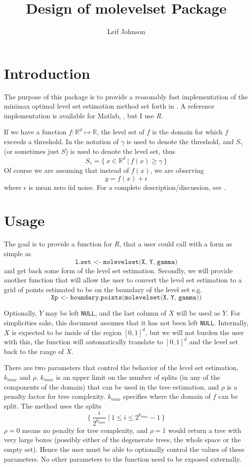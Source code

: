\documentclass[11pt]{article}
\begin{document}
\title{Design of molevelset Package}

\author{Leif Johnson}

\maketitle

\section{Introduction}

The purpose of this package is to provide a reasonably fast
implementation of the minimax optimal level set estimation method set
forth in \cite{willet-nowak}.  A reference implementation is available
for Matlab, \cite{willet-code}, but I use \emph{R}.

If we have a function $f:\mathbb{R}^d\mapsto \mathbb{R}$, the level
set of $f$ is the domain for which $f$ exceeds a threshold.  In the
notation of \cite{willet-nowak} $\gamma$ is used to denote the
threshold, and $S_\gamma$ (or sometimes just $S$) is used to denote
the level set, thus
\[
S_\gamma = \{\: x \in \mathbb{R}^d \: | \: f(x) \geq \gamma \: \}
\]
Of course we are assuming that instead of $f(x)$, we are observing 
\[
y = f(x) + \epsilon
\]
where $\epsilon$ is mean zero iid noise.  For a complete
description/discussion, see \cite{willet-nowak}.

\section{Usage}
The goal is to provide a function for \emph{R}, that a user could call
with a form as simple as 
\[
\texttt{l.set <- molevelset(X, Y, gamma)}
\]
and get back some form of the level set estimation.  Secondly, we will
provide another function that will allow the user to convert the level
set estimation to a grid of points estimated to be on the boundary of
the level set e.g.
\[
\texttt{Xp <- boundary.points(molevelset(X, Y, gamma))}
\]

Optionally, $Y$ may be left \texttt{NULL}, and the last column of $X$
will be used as $Y$.  For simplicities sake, this document assumes
that it has not been left \texttt{NULL}.  Internally, $X$ is expected
to be inside of the region $[0,1]^d$, but we will not burden the user
with this, the function will automatically translate to $[0,1]^d$ and
the level set back to the range of $X$.

There are two parameters that control the behavior of the level set
estimation, $k_{max}$ and $\rho$.  $k_{max}$ is an upper limit on the
number of splits (in any of the components of the domain) that can be
used in the tree estimation, and $\rho$ is a penalty factor for tree
complexity.  $k_{max}$ specifies where the domain of $f$ can be
split.  The method uses the splits 
\[
\{ \: \frac{i}{2^{k_{max}}} \: | \: 1 \leq i \leq 2^{k_{max}} - 1 \: \}
\]
$\rho=0$ means no penalty for tree complexity, and $\rho=1$ would
return a tree with very large boxes (possibly either of the degenerate
trees, the whole space or the empty set).  Hence the user must be able
to optionally control the values of these parameters.  No other
parameters to the function need to be exposed externally.
\end{document}
